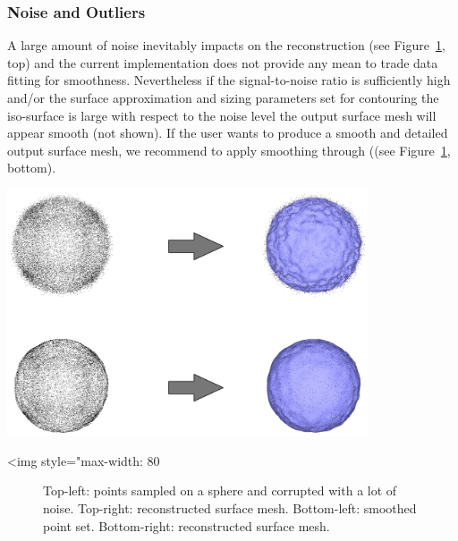 \subsubsection{Noise and Outliers}

A large amount of noise inevitably impacts on the reconstruction (see Figure~\ref{Surface_reconstruction_points_3-fig-noise}, top) and the current implementation does not provide any mean to trade data fitting for smoothness. Nevertheless if the signal-to-noise ratio is sufficiently high and/or the
surface approximation and sizing parameters set for contouring the iso-surface is large with respect to the noise level the output surface mesh will appear smooth (not shown). If the user wants to produce a smooth and detailed output surface mesh, we recommend to apply smoothing through  ((see Figure~\ref{Surface_reconstruction_points_3-fig-noise}, bottom).

\begin{center}
    \begin{ccTexOnly}
        \includegraphics[width=0.8\textwidth]{Surface_reconstruction_points_3/noise}
    \end{ccTexOnly}
    \begin{ccHtmlOnly}
        <img style="max-width: 80%
    \end{ccHtmlOnly}
    \begin{figure}[h]
        \caption{Top-left: points sampled on a sphere and corrupted with a
                 lot of noise.
                 Top-right: reconstructed surface mesh.
                 Bottom-left: smoothed point set.
                 Bottom-right: reconstructed surface mesh.}
        \label{Surface_reconstruction_points_3-fig-noise}
    \end{figure}
\end{center}

